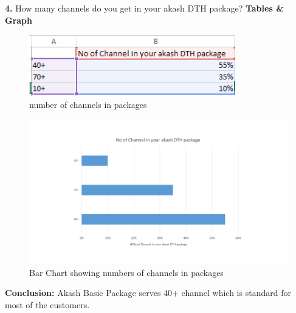 \begin{spacing}{1}
{\bf 4.} How many channels do you get in your akash DTH package?\newline
{\bf Tables \& Graph}\newline
\begin{figure}[H]
	\centering
	\includegraphics[width=0.8\textwidth]{fig4_1}
	\caption{number of channels in packages}
	\label{fig:Table3}
\end{figure}
\begin{figure}[H]
	\centering
	\includegraphics[width=1.2\textwidth]{fig4_2}
	\caption{Bar Chart showing numbers of channels in packages}
	\label{fig:bar1}
\end{figure}
{\bf Conclusion: }\newline
Akash Basic Package serves 40+ channel which is standard for most of the customers.


\end{spacing}
